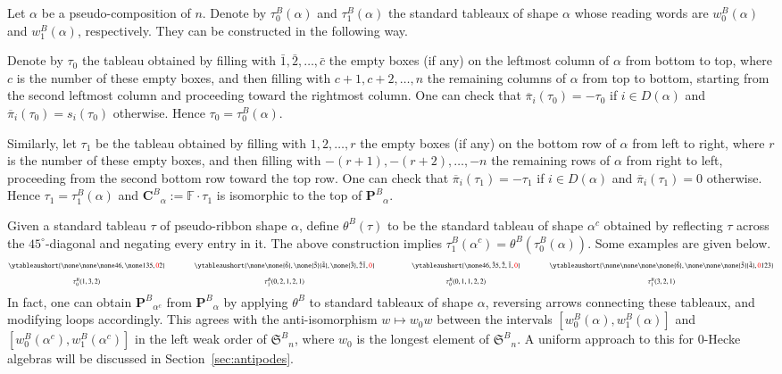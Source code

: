 \documentclass{amsart}
\newtheorem*{Young's Rule}{Young's Rule}
\theoremstyle{definition}
\theoremstyle{remark}
\numberwithin{equation}{section}
\begin{document}
Let $\alpha$ be a pseudo-composition of $n$. Denote by $\tau^B_0(\alpha)$ and $\tau^B_1(\alpha)$ the standard tableaux of shape $\alpha$ whose reading words are $w^B_0(\alpha)$ and $w^B_1(\alpha)$, respectively. They can be constructed in the following way.

Denote by $\tau_0$ the tableau obtained by filling with $\bar1,\bar2,\ldots,\bar c$ the empty boxes (if any) on the leftmost column of $\alpha$ from bottom to top, where $c$ is the number of these empty boxes, and then filling with $c+1,c+2,\ldots,n$ the remaining columns of $\alpha$ from top to bottom, starting from the second leftmost column and proceeding toward the rightmost column. One can check that ${\overline{\pi}}_i(\tau_0)=-\tau_0$ if $i\in D(\alpha)$ and ${\overline{\pi}}_i(\tau_0)=s_i(\tau_0)$ otherwise. Hence $\tau_0=\tau^B_0(\alpha)$. 

Similarly, let $\tau_1$ be the tableau obtained by filling with $1,2,\ldots,r$ the empty boxes (if any) on the bottom row of $\alpha$ from left to right, where $r$ is the number of these empty boxes, and then filling with $-(r+1),-(r+2),\ldots,-n$ the remaining rows of $\alpha$ from right to left, proceeding from the second bottom row toward the top row. One can check that ${\overline{\pi}}_i(\tau_1)=-\tau_1$ if $i\in D(\alpha)$ and ${\overline{\pi}}_i(\tau_1)=0$ otherwise. Hence $\tau_1=\tau^B_1(\alpha)$ 
and ${\mathbf{C}^B}_\alpha:={{\mathbb F}}\cdot\tau_1$ is isomorphic to the top of ${\mathbf{P}^B}_\alpha$.

Given a standard tableau $\tau$ of pseudo-ribbon shape $\alpha$, define $\theta^B(\tau)$ to be the standard tableau of shape $\alpha^c$ obtained by reflecting $\tau$ across the $45^\circ$-diagonal and negating every entry in it. The above construction implies  $\tau^B_1(\alpha^c)=\theta^B(\tau^B_0(\alpha))$. Some examples are given below.  
\[ \scriptsize
\begin{matrix}
\ytableaushort{\none\none\none46,\none135,{\color{red}0}2} & & &
\ytableaushort{\none\none{\bar6},\none{\bar5}{\bar4},\none{\bar3},{\bar2}{\bar1},{\color{red}0}} & \qquad \qquad
\ytableaushort{\none46,{\bar3}5,{\bar2},{\bar1},{\color{red}0}} & &&
\ytableaushort{\none\none\none\none{\bar6},\none\none\none{\bar5}{\bar4},{\color{red}0}123}  \\ \\
\tau^B_0(1,3,2) & & &\tau^B_1(0,2,1,2,1) &\qquad \qquad \tau^B_0(0,1,1,2,2) & && \tau^B_1(3,2,1)
\end{matrix}  \]
In fact, one can obtain ${\mathbf{P}^B}_{\alpha^c}$ from ${\mathbf{P}^B}_{\alpha}$ by applying $\theta^B$ to standard tableaux of shape $\alpha$, reversing arrows connecting these tableaux, and modifying loops accordingly. This agrees with the anti-isomorphism $w\mapsto w_0w$ between the intervals $[w^B_0(\alpha),w^B_1(\alpha)]$ and $[w^B_0(\alpha^c),w^B_1(\alpha^c)]$ in the left weak order of ${{\mathfrak S}^B}_n$, where $w_0$ is the longest element of ${{\mathfrak S}^B}_n$. A uniform approach to this for 0-Hecke algebras will be discussed in Section~\ref{sec:antipodes}.
\end{document}
